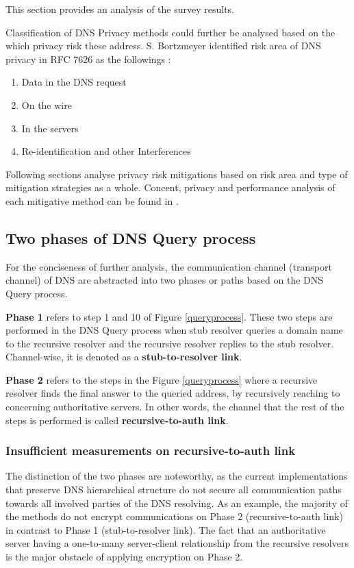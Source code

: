 This section provides an analysis of the survey results.

Classification of DNS Privacy methods could further be analysed based on the which privacy risk these address. S. Bortzmeyer identified risk area of DNS privacy in RFC 7626 as the followings \cite{rfc7626}: 
\begin{enumerate}
    \item Data in the DNS request
    \item On the wire
    \item In the servers
    \item Re-identification and other Interferences
\end{enumerate}
Following sections analyse privacy risk mitigations based on risk area and type of mitigation strategies as a whole. Concent, privacy and performance analysis of each mitigative method can be found in \cite{van2018privacy}.

\subsection{Two phases of DNS Query process}
For the conciseness of further analysis, the communication channel (transport channel) of DNS are abstracted into two phases or paths based on the DNS Query process.

\textbf{Phase 1} refers to step 1 and 10 of Figure \ref{queryprocess}. These two steps are performed in the DNS Query process when stub resolver queries a domain name to the recursive resolver and the recursive resolver replies to the stub resolver.
Channel-wise, it is denoted as a \textbf{stub-to-resolver link}.

\textbf{Phase 2} refers to the steps in the Figure \ref{queryprocess} where a recursive resolver finds the final answer to the queried address, by recursively reaching to concerning authoritative servers. In other words, the channel that the rest of the steps is performed is called \textbf{recursive-to-auth link}.

\subsubsection{Insufficient measurements on recursive-to-auth link}
The distinction of the two phases are noteworthy, as the current implementations that preserve DNS hierarchical structure do not secure all communication paths towards all involved parties of the DNS resolving.
As an example, the majority of the methods do not encrypt communications on Phase 2 (recursive-to-auth link) in contrast to Phase 1 (stub-to-resolver link).
The fact that an authoritative server having a one-to-many server-client relationship from the recursive resolvers is the major obstacle of applying encryption on Phase 2.

